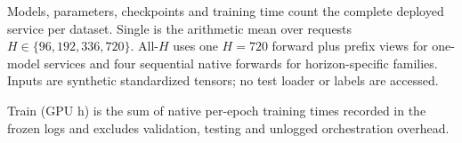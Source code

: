 \documentclass[10pt]{article}
\begin{document}
\begin{table}[!t]
\centering
\caption{Deployment efficiency for serving four requested horizons. Values are macro-averaged over seven datasets on one exclusive RTX 3090 with FP32 and batch size 1.}
\label{tab:iscf-bsca-efficiency}
\scriptsize
{}
\vspace{2pt}
\parbox{\textwidth}{\footnotesize Models, parameters, checkpoints and training time count the complete deployed service per dataset. Single is the arithmetic mean over requests $H\in\{96,192,336,720\}$. All-$H$ uses one $H=720$ forward plus prefix views for one-model services and four sequential native forwards for horizon-specific families. Inputs are synthetic standardized tensors; no test loader or labels are accessed.}
\parbox{\textwidth}{\footnotesize Train (GPU h) is the sum of native per-epoch training times recorded in the frozen logs and excludes validation, testing and unlogged orchestration overhead.}
\end{table}
\end{document}
